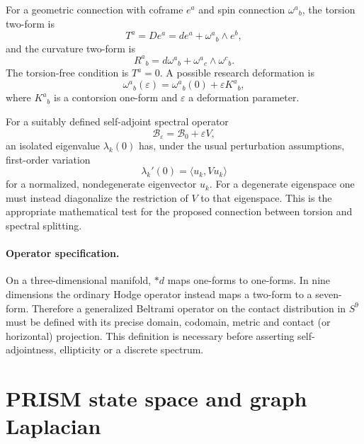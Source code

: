 \documentclass[11pt,a4paper]{article}
\begin{document}
For a geometric connection with coframe $e^a$ and spin connection
$\omega^a{}_b$, the torsion two-form is
\begin{equation}
T^a=De^a=de^a+\omega^a{}_b\wedge e^b,
\end{equation}
and the curvature two-form is
\begin{equation}
R^a{}_b=d\omega^a{}_b+\omega^a{}_c\wedge\omega^c{}_b .
\end{equation}
The torsion-free condition is $T^a=0$. A possible research deformation is
\begin{equation}
\omega^a{}_b(\varepsilon)=\omega^a{}_b(0)+\varepsilon K^a{}_b,
\end{equation}
where $K^a{}_b$ is a contorsion one-form and $\varepsilon$ a deformation
parameter.

For a suitably defined self-adjoint spectral operator
\begin{equation}
\mathcal B_\varepsilon=\mathcal B_0+\varepsilon V,
\end{equation}
an isolated eigenvalue $\lambda_k(0)$ has, under the usual perturbation
assumptions, first-order variation
\begin{equation}
\lambda_k'(0)=\langle u_k,Vu_k\rangle
\end{equation}
for a normalized, nondegenerate eigenvector $u_k$. For a degenerate eigenspace
one must instead diagonalize the restriction of $V$ to that eigenspace. This is
the appropriate mathematical test for the proposed connection between torsion
and spectral splitting.

\paragraph{Operator specification.}
On a three-dimensional manifold, ${*}d$ maps one-forms to one-forms. In nine
dimensions the ordinary Hodge operator instead maps a two-form to a seven-form.
Therefore a generalized Beltrami operator on the contact distribution in $S^9$
must be defined with its precise domain, codomain, metric and contact (or
horizontal) projection. This definition is necessary before asserting
self-adjointness, ellipticity or a discrete spectrum.

\section{PRISM state space and graph Laplacian}
\end{document}
